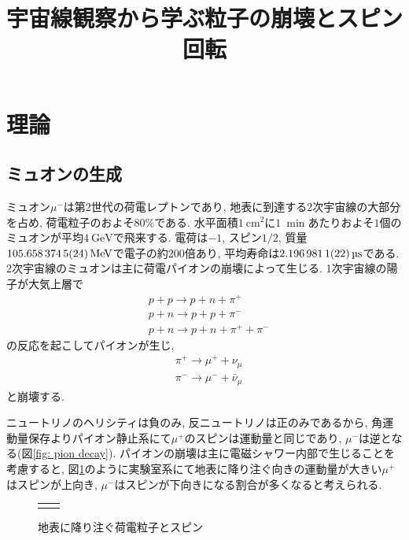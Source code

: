 \documentclass[dvipdfmx]{jsarticle}
\title{宇宙線観察から学ぶ粒子の崩壊とスピン回転
}
\begin{document}
\maketitle

\section{理論}

\subsection{ミュオンの生成}
\label{sec: theory: generation of muon}

ミュオン$\mu^-$は第2世代の荷電レプトンであり, 地表に到達する2次宇宙線の大部分を占め, 荷電粒子のおよそ80\%である\cite{Grupen}.
水平面積$\SI{1}{\cm^2}$に$\SI{1}{\min}$あたりおよそ$1$個のミュオンが平均$\SI{4}{\GeV}$で飛来する\cite{PDG}.
電荷は$-1$, スピン$1/2$, 質量$\SI{105.6583745\pm0.0000024}{\MeV}$で電子の約200倍あり, 平均寿命は$\SI{2.1969811\pm0.0000022}{\micro\second}$である\cite{PDG}.
2次宇宙線のミュオンは主に荷電パイオンの崩壊によって生じる.
1次宇宙線の陽子が大気上層で
\begin{align*}
    &p+p\to p+n+\pi^+
    \\
    &p+n\to p+p+\pi^-
    \\
    &p+n\to p+n+\pi^++\pi^-
\end{align*}
の反応を起こしてパイオンが生じ,
\begin{align*}
    &\pi^+\to\mu^++\nu_\mu
    \\
    &\pi^-\to\mu^-+\bar{\nu}_\mu
\end{align*}
と崩壊する.

ニュートリノのヘリシティは負のみ, 反ニュートリノは正のみであるから, 角運動量保存よりパイオン静止系にて$\mu^+$のスピンは運動量と同じであり, $\mu^-$は逆となる(図\ref{fig: pion decay}).
パイオンの崩壊は主に電磁シャワー内部で生じることを考慮すると, 図\ref{fig: muon shower}のように実験室系にて地表に降り注ぐ向きの運動量が大きい$\mu^+$はスピンが上向き, $\mu^-$はスピンが下向きになる割合が多くなると考えられる.

\begin{figure}
    \centering
    \begin{tabular}{cc}
        \begin{minipage}[t]{0.3\hsize}
            
            \caption{$\pi^+$の崩壊}
            \label{fig: pion decay}
        \end{minipage}
        &
        \begin{minipage}[t]{0.4\hsize}
            \centering
            
            \caption{地表に降り注ぐ荷電粒子とスピン}
            \label{fig: muon shower}
        \end{minipage}
    \end{tabular}
\end{figure}
\end{document}
